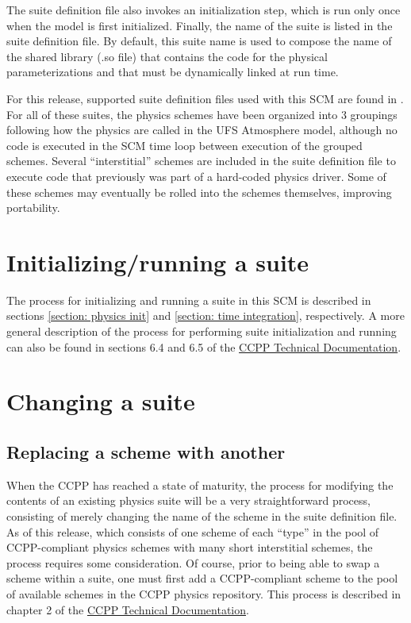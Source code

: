 The suite definition file also invokes an initialization step, which is run only once when the model is first initialized. Finally, the name of the suite is listed in the suite definition file. By default, this suite name is used to compose the name of the shared library (.so file) that contains the code for the physical parameterizations and that must be dynamically linked at run time.

For this release, supported suite definition files used with this SCM are found in . For all of these suites, the physics schemes have been organized into 3 groupings following how the physics are called in the UFS Atmosphere model, although no code is executed in the SCM time loop between execution of the grouped schemes. Several ``interstitial'' schemes are included in the suite definition file to execute code that previously was part of a hard-coded physics driver. Some of these schemes may eventually be rolled into the schemes themselves, improving portability.

\section{Initializing/running a suite}
The process for initializing and running a suite in this SCM is described in sections \ref{section: physics init} and \ref{section: time integration}, respectively. A more general description of the process for performing suite initialization and running can also be found in sections 6.4 and 6.5 of the \href{https://ccpp-techdoc.readthedocs.io/en/v5.0.0/}{CCPP Technical Documentation}.

\section{Changing a suite}

\subsection{Replacing a scheme with another}

When the CCPP has reached a state of maturity, the process for modifying the contents of an existing physics suite will be a very straightforward process, consisting of merely changing the name of the scheme in the suite definition file. As of this release, which consists of one scheme of each ``type'' in the pool of CCPP-compliant physics schemes with many short interstitial schemes, the process requires some consideration. Of course, prior to being able to swap a scheme within a suite, one must first add a CCPP-compliant scheme to the pool of available schemes in the CCPP physics repository. This process is described in chapter 2 of the \href{https://ccpp-techdoc.readthedocs.io/en/v5.0.0/}{CCPP Technical Documentation}.

